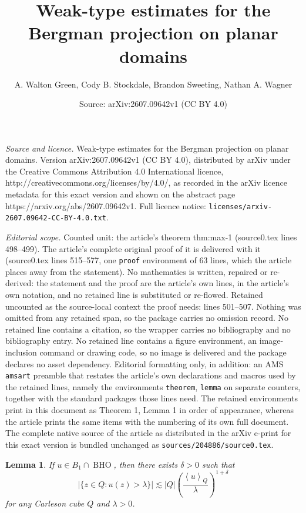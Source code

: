 \documentclass[10pt,a4paper]{amsart}
\title{Weak-type estimates for the Bergman projection on planar domains}
\author{A. Walton Green, Cody B. Stockdale, Brandon Sweeting, Nathan A. Wagner}
\date{Source: arXiv:2607.09642v1 (CC BY 4.0)}
\newtheorem{lemma}{Lemma}
\DeclareMathOperator{\BHO}{BHO}
\newcommand{\avg}[1]{\left\langle {#1}\right\rangle}
\begin{document}
\maketitle

\noindent\emph{Source and licence.} Weak-type estimates for the Bergman projection on planar domains. Version arXiv:2607.09642v1 (CC BY 4.0), distributed by arXiv under the Creative Commons Attribution 4.0 International licence, http://creativecommons.org/licenses/by/4.0/, as recorded in the arXiv licence metadata for this exact version and shown on the abstract page https://arxiv.org/abs/2607.09642v1. Full licence notice: \texttt{licenses/arxiv-2607.09642-CC-BY-4.0.txt}.\par\smallskip

\noindent\textit{Editorial scope.} Counted unit: the article's theorem thm:max-1 (source0.tex lines 498--499). The article's complete original proof of it is delivered with it (source0.tex lines 515--577, one \texttt{proof} environment of 63 lines, which the article places away from the statement). No mathematics is written, repaired or re-derived: the statement and the proof are the article's own lines, in the article's own notation, and no retained line is substituted or re-flowed.  Retained uncounted as the source-local context the proof needs: lines 501--507.  Nothing was omitted from any retained span, so the package carries no omission record.  No retained line contains a citation, so the wrapper carries no bibliography and no bibliography entry.  No retained line contains a figure environment, an image-inclusion command or drawing code, so no image is delivered and the package declares no asset dependency.  Editorial formatting only, in addition: an AMS \texttt{amsart} preamble that restates the article's own declarations and macros used by the retained lines, namely the environments \texttt{theorem}, \texttt{lemma} on separate counters, together with the standard packages those lines need.  The retained environments print in this document as Theorem 1, Lemma 1 in order of appearance, whereas the article prints the same items with the numbering of its own full document.  The complete native source of the article as distributed in the arXiv e-print for this exact version is bundled unchanged as \texttt{sources/204886/source0.tex}.
\begin{lemma}\label{lem:b1}
    If $u \in B_1\cap \BHO$, then there exists $\delta>0$ such that 
    \[
        |\{ z \in Q\colon u(z) > \lambda \}| \lesssim |Q|\left( \frac{\avg{u}_Q}{\lambda}\right)^{1 + \delta}
    \]
    for any Carleson cube $Q$ and $\lambda > 0$.
\end{lemma}
\end{document}
